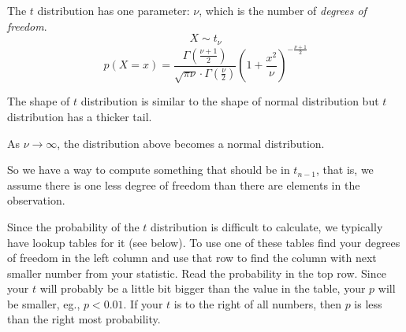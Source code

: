 \begin{aside}
The $t$ distribution has one parameter: $\nu$, which is the number of \textit{degrees of freedom}. 
\[X\sim t_\nu\]
\[p(X=x) = \frac{\Gamma\left(\frac{\nu+1}{2}\right)}{\sqrt{\pi\nu}\cdot\Gamma\left(\frac{\nu}{2}\right)}\left(1+\frac{x^2}{\nu}\right)^{-\frac{\nu+1}{2}}\]

The shape of $t$ distribution is similar to the shape of normal
distribution but $t$ distribution has a thicker tail.

\begin{center}
\end{center}

As $\nu\rightarrow\infty$, the distribution above becomes a normal distribution.

\end{aside}

So we have a way to compute something that should be in $t_{n-1}$, 
that is, we assume there is one less degree of freedom than there are elements in the observation. 

Since the probability of the $t$ distribution is difficult to calculate, we typically have lookup tables for it (see below). 
To use one of these tables find your degrees of freedom in the left column and use that row
to find the column with next smaller number from your statistic.
Read the probability in the top row. 
Since your $t$ will probably be a little bit bigger than the value in the table, 
your $p$ will be smaller, eg., $p<0.01$.
If your $t$ is to the right of all numbers, then $p$ is less than the right most probability. 



